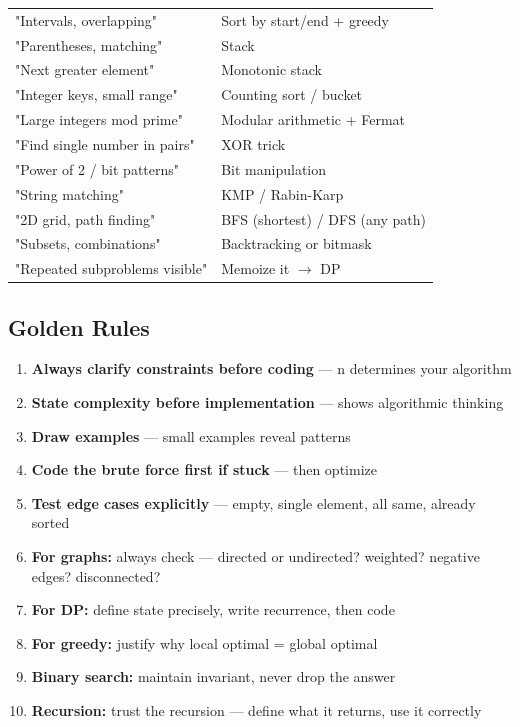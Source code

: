 \documentclass[11pt]{article}
\providecommand{\tightlist}{\setlength{\itemsep}{1pt}\setlength{\parskip}{0pt}}
\begin{document}
\begin{longtable}[]{@{}
  >{\raggedright\arraybackslash}p{}
  >{\raggedright\arraybackslash}p{}@{}}
"Intervals, overlapping" & Sort by start/end + greedy \\
\rowcolor{zebra}
"Parentheses, matching" & Stack \\
"Next greater element" & Monotonic stack \\
\rowcolor{zebra}
"Integer keys, small range" & Counting sort / bucket \\
"Large integers mod prime" & Modular arithmetic + Fermat \\
\rowcolor{zebra}
"Find single number in pairs" & XOR trick \\
"Power of 2 / bit patterns" & Bit manipulation \\
\rowcolor{zebra}
"String matching" & KMP / Rabin-Karp \\
"2D grid, path finding" & BFS (shortest) / DFS (any path) \\
\rowcolor{zebra}
"Subsets, combinations" & Backtracking or bitmask \\
"Repeated subproblems visible" & Memoize it \(\rightarrow\) DP \\
\end{longtable}

\subsection{Golden Rules}\label{golden-rules}

\begin{enumerate}
\def\labelenumi{\arabic{enumi}.}
\tightlist
\item
  \textbf{Always clarify constraints before coding} --- n determines your algorithm
\item
  \textbf{State complexity before implementation} --- shows algorithmic thinking
\item
  \textbf{Draw examples} --- small examples reveal patterns
\item
  \textbf{Code the brute force first if stuck} --- then optimize
\item
  \textbf{Test edge cases explicitly} --- empty, single element, all same, already sorted
\item
  \textbf{For graphs:} always check --- directed or undirected? weighted? negative edges? disconnected?
\item
  \textbf{For DP:} define state precisely, write recurrence, then code
\item
  \textbf{For greedy:} justify why local optimal = global optimal
\item
  \textbf{Binary search:} maintain invariant, never drop the answer
\item
  \textbf{Recursion:} trust the recursion --- define what it returns, use it correctly
\end{enumerate}
\end{document}
